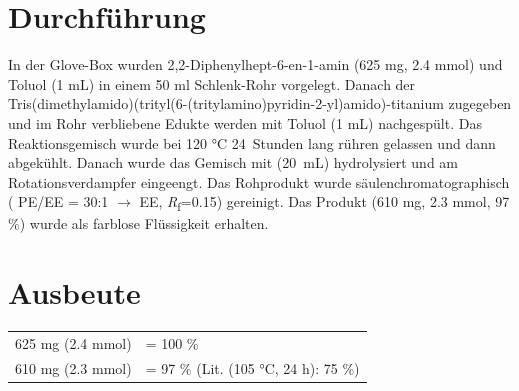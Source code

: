 \documentclass[12pt]{article}
\begin{document}
\begin{onehalfspace}
\section{Durchführung \cite{vor}}
In der Glove-Box wurden 2,2-Diphenylhept-6-en-1-amin (625 \si{\milli\gram}, 2.4 \si{\milli\mol}) und Toluol (1 \si{\milli\liter}) in einem 50 ml Schlenk-Rohr vorgelegt. Danach der Tris(dimethylamido)(trityl(6-(tritylamino)pyridin-2-yl)amido)-titanium zugegeben und im Rohr verbliebene Edukte werden mit Toluol (1 \si{\milli\liter}) nachgespült. Das Reaktionsgemisch wurde bei 120 \si{\celsius} 24~Stunden lang rühren gelassen und dann abgekühlt. Danach wurde das Gemisch mit  (20~\si{\milli\liter}) hydrolysiert und am Rotationsverdampfer eingeengt. Das Rohprodukt 
wurde säulenchromatographisch ( PE/EE = 30:1 $\rightarrow$ EE, \textit{R}\textsubscript{f}=0.15) gereinigt. Das Produkt (610 \si{\milli\gram}, 2.3 \si{\milli\mol}, 97 \%) wurde als farblose Flüssigkeit erhalten.
\section{Ausbeute}
\begin{tabular}{ ll}
  625 \si{\milli\gram} (2.4 \si{\milli\mol})   & = 100 \%\\
  610 \si{\milli\gram} (2.3 \si{\milli\mol})   & = 97 \% (Lit.\cite{vor} (105 \si{\celsius}, 24 h): 75 \%) \\
 \end{tabular}


\end{onehalfspace}
\end{document}
